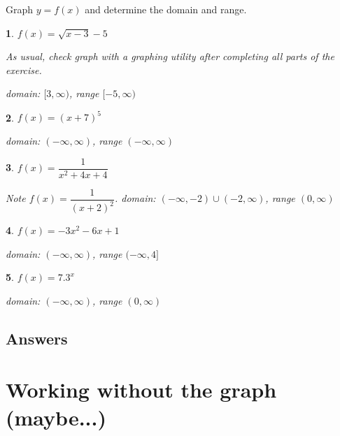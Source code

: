 \documentclass{amsbook}
\newtheorem{exc}{}
\newenvironment{ex}{\begin{exc}\normalfont}{\end{exc}}
\numberwithin{section}{chapter}
\numberwithin{equation}{chapter}
\begin{document}
Graph $y=f(x)$ and determine the domain and range.
\begin{multicols}{2}
	\begin{ex}
		$f(x) = \sqrt{x-3}-5$
		
		\begin{sol}
			As usual, check graph with a graphing utility after completing all parts of the exercise.
			
			domain: $[3,\infty)$, range $[-5, \infty)$
		\end{sol}
	\end{ex}

	\begin{ex}
	$f(x) = (x+7)^5$
	
	\begin{sol}
		domain: $(-\infty,\infty)$, range $(-\infty,\infty)$
	\end{sol}
\end{ex}

	\begin{ex}
	$f(x) = \dfrac{1}{x^2+4x+4}$
	
	\begin{sol}
		Note $f(x) = \dfrac{1}{(x+2)^2}$. domain: $(-\infty,-2)\cup(-2,\infty)$, range $(0,\infty)$
	\end{sol}
\end{ex}

	\begin{ex}
	$f(x) =-3x^2-6x+1$
	
	\begin{sol}
		domain: $(-\infty,\infty)$, range $(-\infty,4]$
	\end{sol}
\end{ex}


\begin{ex}
	$f(x) = 7.3^x$
	
	\begin{sol}
		domain: $(-\infty,\infty)$, range $(0,\infty)$
	\end{sol}
\end{ex}
\end{multicols}


\subsection*{Answers \nopunct} \hfill
\begin{multicols}{2}
	
\end{multicols}


\newpage
\section{Working without the graph (maybe...)}
\end{document}
